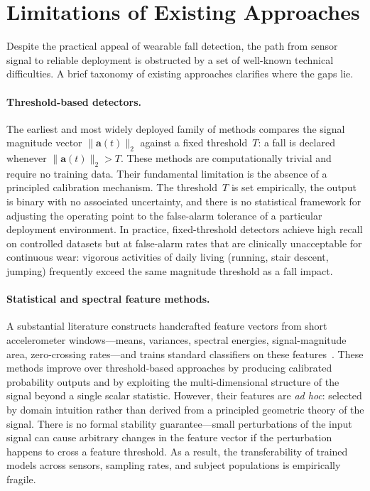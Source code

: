 \documentclass[onluarkali,ingilizce,yukseklisans,karton,LisansustuEgitim]{itutez}
\providecommand{\1}{\mathbf{1}}
\begin{document}
\section{Limitations of Existing Approaches}
\label{subsec:limitations-related}

Despite the practical appeal of wearable fall detection, the path from sensor signal
to reliable deployment is obstructed by a set of well-known technical difficulties.
A brief taxonomy of existing approaches clarifies where the gaps lie.

\paragraph{Threshold-based detectors.}
The earliest and most widely deployed family of methods compares the signal magnitude
vector $\|\mathbf{a}(t)\|_2$ against a fixed threshold~$T$: a fall is declared
whenever $\|\mathbf{a}(t)\|_2 > T$.  These methods are computationally trivial and
require no training data.  Their fundamental limitation is the absence of a principled
calibration mechanism.  The threshold~$T$ is set empirically, the output is binary
with no associated uncertainty, and there is no statistical framework for adjusting
the operating point to the false-alarm tolerance of a particular deployment environment.
In practice, fixed-threshold detectors achieve high recall on controlled datasets but
at false-alarm rates that are clinically unacceptable for continuous wear: vigorous
activities of daily living (running, stair descent, jumping) frequently exceed the
same magnitude threshold as a fall impact.

\paragraph{Statistical and spectral feature methods.}
A substantial literature constructs handcrafted feature vectors from short
accelerometer windows---means, variances, spectral energies, signal-magnitude
area, zero-crossing rates---and trains standard classifiers on these
features~\parencite{igual2013challenges, delahoz2014survey}.  These methods improve over
threshold-based approaches by producing calibrated probability outputs and by
exploiting the multi-dimensional structure of the signal beyond a single scalar
statistic.  However, their features are \emph{ad hoc}: selected by domain intuition
rather than derived from a principled geometric theory of the signal.  There is
no formal stability guarantee---small perturbations of the input signal can cause
arbitrary changes in the feature vector if the perturbation happens to cross a
feature threshold.  As a result, the transferability of trained models across
sensors, sampling rates, and subject populations is empirically fragile.
\end{document}

